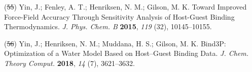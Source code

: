 \documentclass[11pt,notitlepage]{article}
\providecommand{\DIFaddtex}[1]{{\protect\color{blue}\uwave{#1}}} %
\providecommand{\DIFdeltex}[1]{{\protect\color{red}\sout{#1}}}                      %
\providecommand{\DIFaddbegin}{} %
\providecommand{\DIFaddend}{} %
\providecommand{\DIFdelbegin}{} %
\providecommand{\DIFdelend}{} %
\providecommand{\DIFadd}[1]{\texorpdfstring{\DIFaddtex{#1}}{#1}} %
\providecommand{\DIFdel}[1]{\texorpdfstring{\DIFdeltex{#1}}{}} %
\newcommand{\DIFscaledelfig}{0.5}
\newlength{\DIFdelgraphicswidth} %
\newlength{\DIFdelgraphicsheight} %
\newcommand{\DIFaddincludegraphics}[2][]{{\color{blue}\fbox{\DIFOincludegraphics[#1]{#2}}}} %
\newcommand{\DIFdelincludegraphics}[2][]{%
\sbox{\DIFdelgraphicsbox}{\DIFOincludegraphics[#1]{#2}}%
\settoboxwidth{\DIFdelgraphicswidth}{\DIFdelgraphicsbox} %
\settoboxtotalheight{\DIFdelgraphicsheight}{\DIFdelgraphicsbox} %
\scalebox{\DIFscaledelfig}{%
\parbox[b]{\DIFdelgraphicswidth}{\usebox{\DIFdelgraphicsbox}\\[-\baselineskip] \rule{\DIFdelgraphicswidth}{0em}}\llap{\resizebox{\DIFdelgraphicswidth}{\DIFdelgraphicsheight}{%
\setlength{\unitlength}{\DIFdelgraphicswidth}%
\begin{picture}(1,1)%
\thicklines\linethickness{2pt} %
{\color[rgb]{1,0,0}\put(0,0){\framebox(1,1){}}}%
{\color[rgb]{1,0,0}\put(0,0){\line( 1,1){1}}}%
{\color[rgb]{1,0,0}\put(0,1){\line(1,-1){1}}}%
\end{picture}%
}\hspace*{3pt}}} %
} %
\DeclareRobustCommand{\DIFaddbegin}{\DIFOaddbegin \let\includegraphics\DIFaddincludegraphics} %
\DeclareRobustCommand{\DIFaddend}{\DIFOaddend \let\includegraphics\DIFOincludegraphics} %
\DeclareRobustCommand{\DIFdelbegin}{\DIFOdelbegin \let\includegraphics\DIFdelincludegraphics} %
\DeclareRobustCommand{\DIFdelend}{\DIFOaddend \let\includegraphics\DIFOincludegraphics} %
\begin{document}
\leavevmode\hypertarget{ref-xRauI5mb}{}%
(\DIFdelbegin \DIFdel{55}\DIFdelend \DIFaddbegin \DIFadd{63}\DIFaddend ) Yin, J.; Fenley, A. T.; Henriksen, N. M.; Gilson, M. K. Toward
Improved Force-Field Accuracy Through Sensitivity Analysis of Host-Guest
Binding Thermodynamics. \emph{J. Phys. Chem. B} \textbf{2015},
\emph{119} (32), 10145--10155.

\leavevmode\hypertarget{ref-NeqIQDLp}{}%
(\DIFdelbegin \DIFdel{56}\DIFdelend \DIFaddbegin \DIFadd{64}\DIFaddend ) Yin, J.; Henriksen, N. M.; Muddana, H. S.; Gilson, M. K. Bind3P:
Optimization of a Water Model Based on Host--Guest Binding Data.
\emph{J. Chem. Theory Comput.} \textbf{2018}, \emph{14} (7), 3621--3632.
\end{document}

